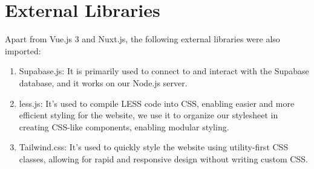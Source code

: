 
\section{External Libraries}
Apart from Vue.js 3 and Nuxt.js, the following external libraries were also imported:
\begin{enumerate}
	\item Supabase.js: It is primarily used to connect to and interact with the Supabase database, and it works on our Node.js server.
	\item less.js: It's used to compile LESS code into CSS, enabling easier and more efficient styling for the website, we use it to organize our stylesheet in creating CSS-like components, enabling modular styling.
	\item Tailwind.css: It's used to quickly style the website using utility-first CSS classes, allowing for rapid and responsive design without writing custom CSS.
\end{enumerate}